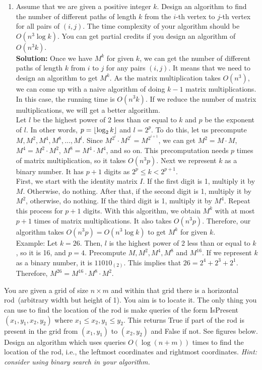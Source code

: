 \documentclass[11pt]{article}
\begin{document}
\begin{qunlist}
\begin{enumerate}
    \item Assume that we are given a positive integer $k$. Design an algorithm to find the number of different paths of length $k$ from the $i$-th vertex to $j$-th vertex for all pairs of $(i,j)$. The time complexity of your algorithm should be $O(n^3 \log k)$. You can get partial credits if you design an algorithm of $O(n^3 k)$.\\
    \textbf{Solution:} Once we have $M^k$ for given $k$, we can get the number of different paths of length $k$ from $i$ to $j$ for any pairs $(i, j)$. It means that we need to design an algorithm to get $M^k$. As the matrix multiplication takes $O(n^3)$, we can come up with a naive algorithm of doing $k-1$ matrix multiplications. In this case, the running time is $O(n^3 k)$. If we reduce the number of matrix multiplications, we will get a better algorithm. \\
    Let $l$ be the highest power of 2 less than or equal to $k$ and $p$ be the exponent of $l$. In other words, $p = \lfloor \log_2 k \rfloor$ and $l = 2^p$. To do this, let us precompute $M, M^2, M^4, M^8, ..., M^l$. Since $M^{2^i} \cdot M^{2^i} = M^{2^{i+1}}$, we can get $M^2 = M\cdot M$, $M^4 = M^2 \cdot M^2$, $M^8 = M^4 \cdot M^4$, and so on. This precomputation needs $p$ times of matrix multiplication, so it takes $O(n^3 p)$. Next we represent $k$ as a binary number. It has $p + 1$ digits as $2^p \leq k < 2^{p+1}$. \\
    First, we start with the identity matrix $I$. If the first digit is 1, multiply it by $M$. Otherwise, do nothing. After that, if the second digit is 1, multiply it by $M^2$, otherwise, do nothing. If the third digit is 1, multiply it by $M^4$. Repeat this process for $p+1$ digits. With this algorithm, we obtain $M^k$ with at most $p + 1$ times of matrix multiplications. It also takes $O(n^3 p)$. Therefore, our algorithm takes $O(n^3 p)=O(n^3 \log k)$ to get $M^k$ for given $k$.\\
    Example: Let $k = 26$. Then, $l$ is the highest power of 2 less than or equal to $k$, so it is 16, and $p = 4$. Precompute $M, M^2, M^4, M^8$ and $M^{16}$. If we represent $k$ as a binary number, it is $11010_{(2)}$. This implies that $26 = 2^4 + 2^3 + 2^1$. Therefore, $M^{26} = M^{16} \cdot M^8 \cdot M^2$.
\end{enumerate}

You are given a grid of size $n\times m$ and within that grid there is a
horizontal rod~(arbitrary width but height of 1). You aim is to locate it. The only thing you can use to find the
location of the rod is make queries of the form IsPresent~$(x_1,y_1,x_2,y_2)$
where $x_1 \leq x_2 , y_1 \leq y_2$. This returns True if part of the rod is
present in the grid from $(x_1,y_1)$ to $(x_2,y_2)$ and False if not. See figures below.  Design
an algorithm which uses queries $O(\log(n + m))$ times to find the location of the rod, i.e., the leftmost coordinates and rightmost coordinates.
\emph{Hint: consider using binary search in your algorithm.}


\end{qunlist}
\end{document}
